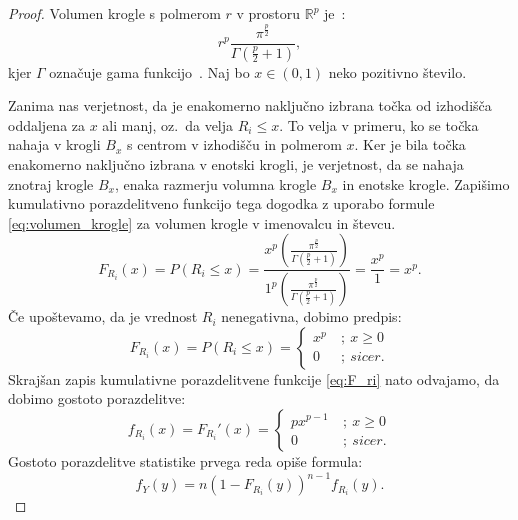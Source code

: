 \documentclass[12pt,a4paper,twoside]{article}
\theoremstyle{definition} %
\theoremstyle{plain} %
\numberwithin{equation}{section}  %
\begin{document}
\begin{proof}
	Volumen krogle s polmerom $r$ v prostoru $\mathbb{R}^p$ je~\cite[enačba~5.19.4]{nist_dlmf}:
	\begin{equation}
	\label{eq:volumen_krogle}
		r^p \frac{\pi^{\frac{p}{2}}}{\Gamma (\frac{p}{2}+1)},
	\end{equation}
	kjer $\Gamma$ označuje gama funkcijo~\cite[enačba~5.4.1]{nist_dlmf}. %
	Naj bo $x \in (0,1)$ neko pozitivno število.

	Zanima nas verjetnost, da je enakomerno naključno izbrana točka od izhodišča oddaljena za $x$ ali manj, oz.~da velja $R_i \leq x$.
	To velja v primeru, ko se točka nahaja v krogli $B_x$ s centrom v izhodišču in polmerom $x$.
	Ker je bila točka enakomerno naključno izbrana v enotski krogli, je verjetnost, da se nahaja znotraj krogle $B_x$, enaka razmerju volumna krogle $B_x$ in enotske krogle.
	Zapišimo kumulativno porazdelitveno funkcijo tega dogodka z uporabo formule \ref{eq:volumen_krogle} za volumen krogle v imenovalcu in števcu.
	\begin{equation*}
		F_{R_i}(x) = 
		P(R_i \leq x) = 
		\frac{x^p \left( \frac{\pi^{\frac{p}{2}}}{\Gamma (\frac{p}{2}+1)} \right)}{1^p \left( \frac{\pi^{\frac{p}{2}}}{\Gamma (\frac{p}{2}+1)} \right)} =
		\frac{x^p}{1} = x^p.
	\end{equation*}
	Če upoštevamo, da je vrednost $R_i$ nenegativna, dobimo predpis:
	\begin{equation}
	\label{eq:F_ri}
		F_{R_i}(x) = 
		P(R_i \leq x) = 
		\begin{cases}
			x^p\ &;\ x \geq 0 \\
			0\ &;\ sicer.
		\end{cases}
	\end{equation}
	Skrajšan zapis kumulativne porazdelitvene funkcije \ref{eq:F_ri} nato odvajamo, da dobimo gostoto porazdelitve:
	\begin{equation}
	\label{eq:f_ri}
		f_{R_i}(x) = 
		F_{R_i} '(x) =
		\begin{cases}
			p x^{p-1}\ &;\ x \geq 0 \\
			0\ &;\ sicer.
		\end{cases} 
	\end{equation}
	Gostoto porazdelitve statistike prvega reda \cite[pogl.~4.6]{hogg2005introduction} opiše formula:
	\begin{equation*}
		f_Y(y) = n(1 - F_{R_i}(y))^{n-1} f_{R_i}(y).

\end{equation*}
\end{proof}
\end{document}
